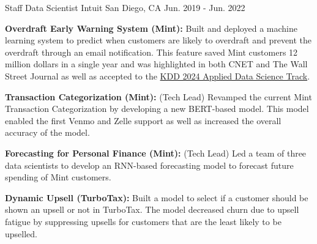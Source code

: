 \begin{cventries}
\cventry
    {Staff Data Scientist} %
    {Intuit} %
    {San Diego, CA} %
    {Jun. 2019 - Jun. 2022} %
    {\begin{cvitems}
        \setlength\itemsep{.15em}
        \item { \textbf{Overdraft Early Warning System (Mint): }Built and deployed a machine learning system to predict when customers are likely to overdraft and prevent the overdraft through an email notification. This feature saved Mint customers 12 million dollars in a single year and was highlighted in both CNET and The Wall Street Journal as well as accepted to the \href{https://arxiv.org/abs/2302.02455}{KDD 2024 Applied Data Science Track}. }
        \item { \textbf{Transaction Categorization (Mint): } (Tech Lead) Revamped the current Mint Transaction Categorization by developing a new BERT-based model. This model enabled the first Venmo and Zelle support as well as increased the overall accuracy of the model. }
         \item { \textbf{Forecasting for Personal Finance (Mint): } (Tech Lead) Led a team of three data scientists to develop an RNN-based forecasting model to forecast future spending of Mint customers.}
         \item { \textbf{Dynamic Upsell (TurboTax):} Built a model to select if a customer should be shown an upsell or not in TurboTax. The model decreased churn due to upsell fatigue by suppressing upsells for customers that are the least likely to be upselled. }
     \end{cvitems}}



\end{cventries}
